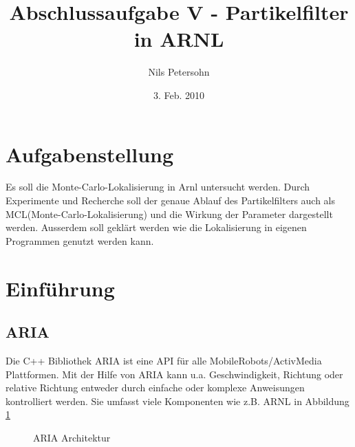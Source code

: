 \documentclass{article}
\title{Abschlussaufgabe V - Partikelfilter in ARNL}
\author{Nils Petersohn}
\date{3. Feb. 2010}
\begin{document}
\maketitle

\tableofcontents
\listoftables
 
\section{Aufgabenstellung}
Es soll die Monte-Carlo-Lokalisierung in Arnl untersucht werden. Durch Experimente und Recherche soll der genaue Ablauf des Partikelfilters auch als MCL(Monte-Carlo-Lokalisierung) und die Wirkung der Parameter dargestellt werden. Ausserdem soll gekl\"art werden wie die Lokalisierung in eigenen Programmen genutzt werden kann.


\section{Einf\"uhrung}\label{einfuehrung}



\subsection{ARIA}
Die C++ Bibliothek ARIA ist eine API f\"ur alle MobileRobots/ActivMedia Plattformen. Mit der Hilfe von ARIA kann u.a. Geschwindigkeit, Richtung oder relative Richtung entweder durch einfache oder komplexe Anweisungen kontrolliert werden. Sie umfasst viele Komponenten wie z.B. ARNL in Abbildung \ref{ariaarch}
\begin{figure}
  \centering
  \caption{ARIA Architektur}
  \label{ariaarch}
\end{figure}
\end{document}

